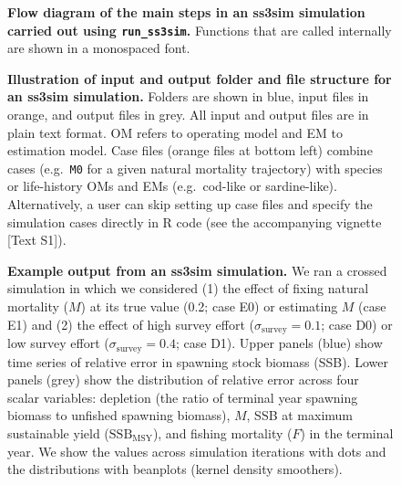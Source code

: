 \documentclass[10pt]{article}
\begin{document}
\begin{figure}[!ht]
 \begin{center}
 \end{center}
\caption{
{\bf Flow diagram of the main steps in an ss3sim simulation carried out using
  \texttt{run\_ss3sim}.} Functions that are called internally are shown in a
monospaced font.
}
\label{fig:sim-steps}
\end{figure}


\begin{figure}[!ht]
 \begin{center}
 \end{center}
\caption{
{\bf Illustration of input and output folder and file structure for an ss3sim
  simulation.} Folders are shown in blue, input files in orange, and output
files in grey. All input and output files are in plain text format. OM refers
to operating model and EM to estimation model. Case files (orange files at
bottom left) combine cases (e.g.~\texttt{M0} for a given natural mortality
trajectory) with species or life-history OMs and EMs (e.g.~cod-like or
sardine-like). Alternatively, a user can skip setting up case files and specify
the simulation cases directly in \textsf{R} code (see the accompanying vignette
[Text S1]).
}
\end{figure}


\begin{figure}[!ht]
 \begin{center}
 \end{center}
\caption{
{\bf Example output from an ss3sim simulation.} We ran a crossed simulation in
which we considered (1) the effect of fixing natural mortality ($M$) at its
true value (0.2; case E0) or estimating $M$ (case E1) and (2) the effect of
high survey effort ($\sigma_\mathrm{survey} = 0.1$; case D0) or low survey
effort ($\sigma_\mathrm{survey} = 0.4$; case D1). Upper panels (blue) show time
series of relative error in spawning stock biomass (SSB). Lower panels (grey)
show the distribution of relative error across four scalar variables: depletion
(the ratio of terminal year spawning biomass to unfished spawning biomass),
$M$, SSB at maximum sustainable yield ($\mathrm{SSB}_\mathrm{MSY}$), and
fishing mortality ($F$) in the terminal year. We show the values across
simulation iterations with dots and the distributions with beanplots (kernel
density smoothers).
}
\label{fig:results}
\end{figure}
\end{document}
